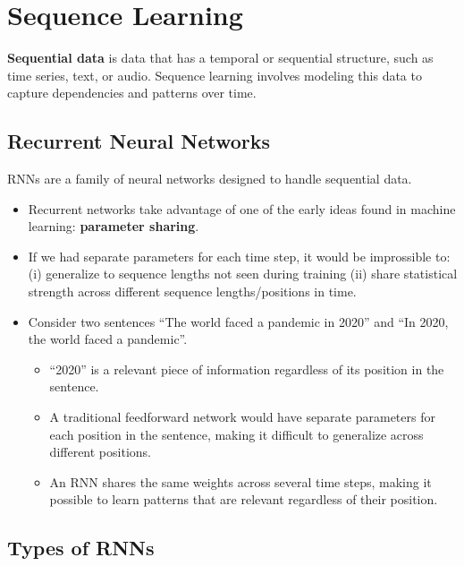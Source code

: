 \section*{Sequence Learning}

\textbf{Sequential data} is data that has a temporal or sequential structure, such as time series, text, or audio. Sequence learning involves modeling this data to capture dependencies and patterns over time.

\subsection*{Recurrent Neural Networks}

RNNs are a family of neural networks designed to handle sequential data. 
\begin{itemize}
  
  \item Recurrent networks take advantage of one of the early ideas found in machine learning: \textbf{parameter sharing}.
  \item If we had separate parameters for each time step, it would be improssible to: (i) generalize to sequence lengths not seen during training (ii) share statistical strength across different sequence lengths/positions in time.
  \item Consider two sentences \enquote{The world faced a pandemic in 2020} and \enquote{In 2020, the world faced a pandemic}.
    \begin{itemize}
      \item \enquote{2020} is a relevant piece of information regardless of its position in the sentence.
      \item A traditional feedforward network would have separate parameters for each position in the sentence, making it difficult to generalize across different positions.
      \item An RNN shares the same weights across several time steps, making it possible to learn patterns that are relevant regardless of their position.
    \end{itemize}
\end{itemize}

\subsection*{Types of RNNs}

